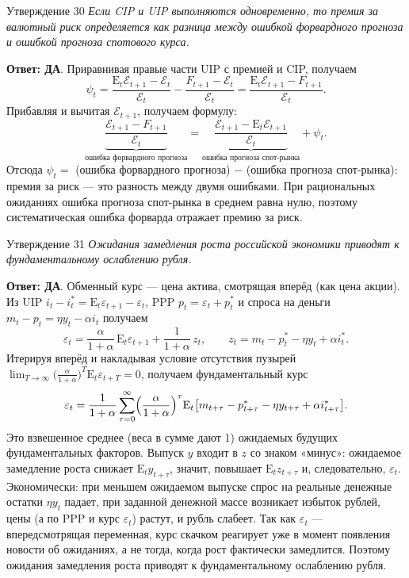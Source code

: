 \documentclass[10pt,a4paper]{article}
\newcommand{\qda}{\textbf{\color{yesgreen}Ответ: ДА}}
\newenvironment{answer}[2]{%
  \begin{qbox}{Утверждение #1}
  \textit{#2}\par\smallskip
}{%
  \end{qbox}\vspace{2pt}
}
\begin{document}
\begin{answer}{30}{Если CIP и UIP выполняются одновременно, то премия за валютный риск определяется как разница между ошибкой форвардного прогноза и ошибкой прогноза спотового курса.}
\qda. Приравнивая правые части UIP с премией и CIP, получаем
\[
\psi_t=\dfrac{\mathrm{E}_t\mathcal{E}_{t+1}-\mathcal{E}_t}{\mathcal{E}_t}-\dfrac{F_{t+1}-\mathcal{E}_t}{\mathcal{E}_t}=\dfrac{\mathrm{E}_t\mathcal{E}_{t+1}-F_{t+1}}{\mathcal{E}_t}.
\]
Прибавляя и вычитая $\mathcal{E}_{t+1}$, получаем формулу:
\[
\underbrace{\dfrac{\mathcal{E}_{t+1}-F_{t+1}}{\mathcal{E}_t}}_{\text{ошибка форвардного прогноза}}=\underbrace{\dfrac{\mathcal{E}_{t+1}-\mathrm{E}_t\mathcal{E}_{t+1}}{\mathcal{E}_t}}_{\text{ошибка прогноза спот-рынка}}+\psi_t .
\]
Отсюда $\psi_t=$ (ошибка форвардного прогноза) $-$ (ошибка прогноза спот-рынка): премия за риск --- это разность между двумя ошибками. При рациональных ожиданиях ошибка прогноза спот-рынка в среднем равна нулю, поэтому систематическая ошибка форварда отражает премию за риск.
\end{answer}

\begin{answer}{31}{Ожидания замедления роста российской экономики приводят к фундаментальному ослаблению рубля.}
\qda. Обменный курс --- цена актива, смотрящая вперёд (как цена акции). Из UIP $i_t-i_t^*=\mathrm{E}_t\varepsilon_{t+1}-\varepsilon_t$, PPP $p_t=\varepsilon_t+p_t^*$ и спроса на деньги $m_t-p_t=\eta y_t-\alpha i_t$ получаем
\[
\varepsilon_t=\dfrac{\alpha}{1+\alpha}\,\mathrm{E}_t\varepsilon_{t+1}+\dfrac{1}{1+\alpha}\,z_t,\qquad z_t=m_t-p_t^*-\eta y_t+\alpha i_t^*.
\]
Итерируя вперёд и накладывая условие отсутствия пузырей $\lim_{T\to\infty}\bigl(\tfrac{\alpha}{1+\alpha}\bigr)^T\mathrm{E}_t\varepsilon_{t+T}=0$, получаем фундаментальный курс
\[
\varepsilon_t=\dfrac{1}{1+\alpha}\sum_{\tau=0}^{\infty}\Bigl(\dfrac{\alpha}{1+\alpha}\Bigr)^{\tau}\mathrm{E}_t\bigl[m_{t+\tau}-p^*_{t+\tau}-\eta y_{t+\tau}+\alpha i^*_{t+\tau}\bigr].
\]
Это взвешенное среднее (веса в сумме дают 1) ожидаемых будущих фундаментальных факторов. Выпуск $y$ входит в $z$ со знаком «минус»: ожидаемое замедление роста снижает $\mathrm{E}_ty_{t+\tau}$, значит, повышает $\mathrm{E}_tz_{t+\tau}$ и, следовательно, $\varepsilon_t$. Экономически: при меньшем ожидаемом выпуске спрос на реальные денежные остатки $\eta y_t$ падает, при заданной денежной массе возникает избыток рублей, цены (а по PPP и курс $\varepsilon_t$) растут, и рубль слабеет. Так как $\varepsilon_t$ --- впередсмотрящая переменная, курс скачком реагирует уже в момент появления новости об ожиданиях, а не тогда, когда рост фактически замедлится. Поэтому ожидания замедления роста приводят к фундаментальному ослаблению рубля.
\end{answer}
\end{document}
